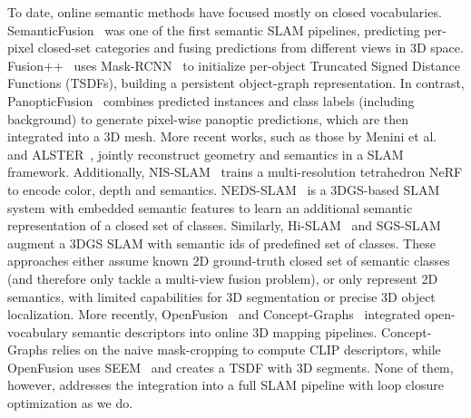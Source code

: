 To date, online semantic methods have focused mostly  on closed vocabularies. SemanticFusion~\cite{mccormac2017semanticfusion} was one of the first semantic SLAM pipelines, predicting per-pixel closed-set categories and fusing predictions from different views in 3D space. Fusion++~\cite{mccormac2018fusion++} uses Mask-RCNN~\cite{he2017mask} to initialize per-object Truncated Signed Distance Functions (TSDFs), building a persistent object-graph representation.
In contrast, PanopticFusion~\cite{narita2019panopticfusion} combines predicted instances and class labels (including background) to generate pixel-wise panoptic predictions, which are then integrated into a 3D mesh. More recent works, such as those by Menini et al.~\cite{menini2021real} and ALSTER~\cite{weder2023alster}, jointly reconstruct geometry and semantics in a SLAM framework.
Additionally, NIS-SLAM~\cite{zhai2024nis} trains a multi-resolution tetrahedron NeRF to encode color, depth and semantics. 
NEDS-SLAM~\cite{ji2024neds} is a 3DGS-based SLAM system with embedded semantic features to learn an additional semantic representation of a closed set of classes.
Similarly, Hi-SLAM~\cite{li2024hi} and SGS-SLAM~\cite{li2024sgs} augment a 3DGS SLAM with semantic ids of predefined set of classes. 
These approaches either assume known 2D ground-truth closed set of semantic classes (and therefore only tackle a multi-view fusion problem), or only represent 2D semantics, with limited capabilities for 3D segmentation or precise 3D object localization.
%
More recently, OpenFusion~\cite{yamazaki2024open} and Concept-Graphs~\cite{gu2024conceptgraphs} integrated open-vocabulary semantic descriptors into online 3D mapping pipelines. Concept-Graphs relies on the naive mask-cropping to compute CLIP descriptors, while OpenFusion uses SEEM~\cite{zou2023segment} and creates a TSDF with 3D segments. 
None of them, however, addresses the integration into a full SLAM pipeline with loop closure optimization as we do. %

